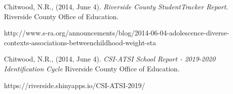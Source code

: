         \item {Chitwood, N.R., (2014, June 4). \textit{Riverside County StudentTracker Report.} Riverside County Office of Education. \raggedright{http://www.s-ra.org/announcements/blog/2014-06-04-adolescence-diverse-contexts-associations-betweenchildhood-weight-sta}}
        \item {Chitwood, N.R., (2014, June 4). \textit{CSI-ATSI School Report - 2019-2020 Identification Cycle} Riverside County Office of Education. \raggedright{https://riverside.shinyapps.io/CSI-ATSI-2019/}}
        \item {}